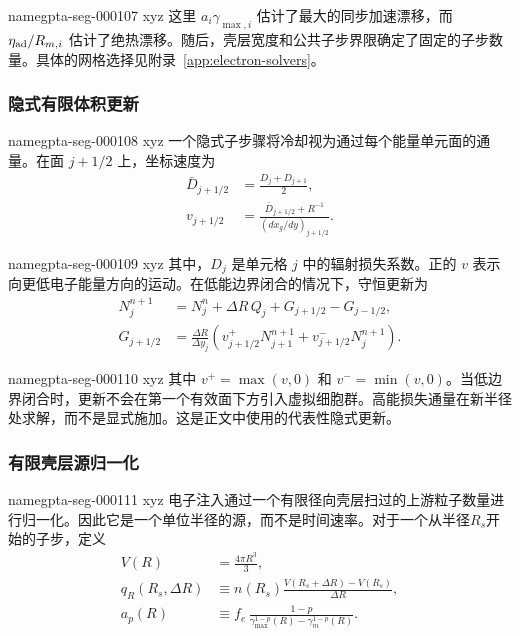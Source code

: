\documentclass[twocolumn]{aastex702}
\makeatletter
\providecommand{\gptareaderanchor}[1]{\pdfdest name{#1} xyz}%
\providecommand{\gptareaderanchor}[1]{\special{pdf:dest (#1) [ @thispage /XYZ @xpos @ypos null ]}}%
\makeatother
\begin{document}
\gptareaderanchor{gpta-seg-000107}%
这里 \(a_i\gamma_{\max,i}\) 估计了最大的同步加速漂移，而 \(\eta_{\rm ad}/R_{m,i}\) 估计了绝热漂移。随后，壳层宽度和公共子步界限确定了固定的子步数量。具体的网格选择见附录~\ref{app:electron-solvers}。

\subsubsection{隐式有限体积更新}


\gptareaderanchor{gpta-seg-000108}%
一个隐式子步骤将冷却视为通过每个能量单元面的通量。在面 \(j+1/2\) 上，坐标速度为
\begin{equation}
\begin{aligned}
\bar D_{j+1/2}&=\frac{D_j+D_{j+1}}{2},\\
v_{j+1/2}&=
\frac{\bar D_{j+1/2}+R^{-1}}
{(dx_g/dy)_{j+1/2}}.
\end{aligned}
\end{equation}

\gptareaderanchor{gpta-seg-000109}%
其中，\(D_j\) 是单元格 \(j\) 中的辐射损失系数。正的 \(v\) 表示向更低电子能量方向的运动。在低能边界闭合的情况下，守恒更新为
\begin{equation}
\begin{aligned}
N_j^{n+1}&=N_j^n+\Delta R\,Q_j
+G_{j+1/2}-G_{j-1/2},\\
G_{j+1/2}&=\frac{\Delta R}{\Delta y_j}
\left(v_{j+1/2}^{+}N_{j+1}^{n+1}
+v_{j+1/2}^{-}N_j^{n+1}\right).
\end{aligned}
\end{equation}

\gptareaderanchor{gpta-seg-000110}%
其中 \(v^+=\max(v,0)\) 和 \(v^-=\min(v,0)\)。当低边界闭合时，更新不会在第一个有效面下方引入虚拟细胞群。高能损失通量在新半径处求解，而不是显式施加。这是正文中使用的代表性隐式更新。

\subsubsection{有限壳层源归一化}


\gptareaderanchor{gpta-seg-000111}%
电子注入通过一个有限径向壳层扫过的上游粒子数量进行归一化。因此它是一个单位半径的源，而不是时间速率。对于一个从半径\(R_s\)开始的子步，定义
\begin{equation}
\begin{aligned}
V(R)&=\frac{4\pi R^3}{3},\\
q_R(R_s,\Delta R)&\equiv
n(R_s)\frac{V(R_s+\Delta R)-V(R_s)}{\Delta R},\\
a_p(R)&\equiv
f_e\,\frac{1-p}{\gamma_{\max}^{1-p}(R)-\gamma_m^{1-p}(R)} .
\end{aligned}
\end{equation}
\end{document}
